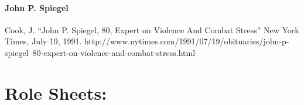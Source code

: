 \begin{refsection}
\begin{appendices}
\subsection{John P. Spiegel}
\label{johnp.spiegel}

Cook, J. “John P. Spiegel, 80, Expert on Violence And Combat Stress” New York Times, July 19, 1991. http:\slash \slash www.nytimes.com\slash 1991\slash 07\slash 19\slash obituaries\slash john-p-spiegel--80-expert-on-violence-and-combat-stress.html

\end{appendices}


\end{refsection}
\stopcontents[instructors]


\pagebreak 


\frontmatter 

\part{Role Sheets:}
\label{rolesheets:}

